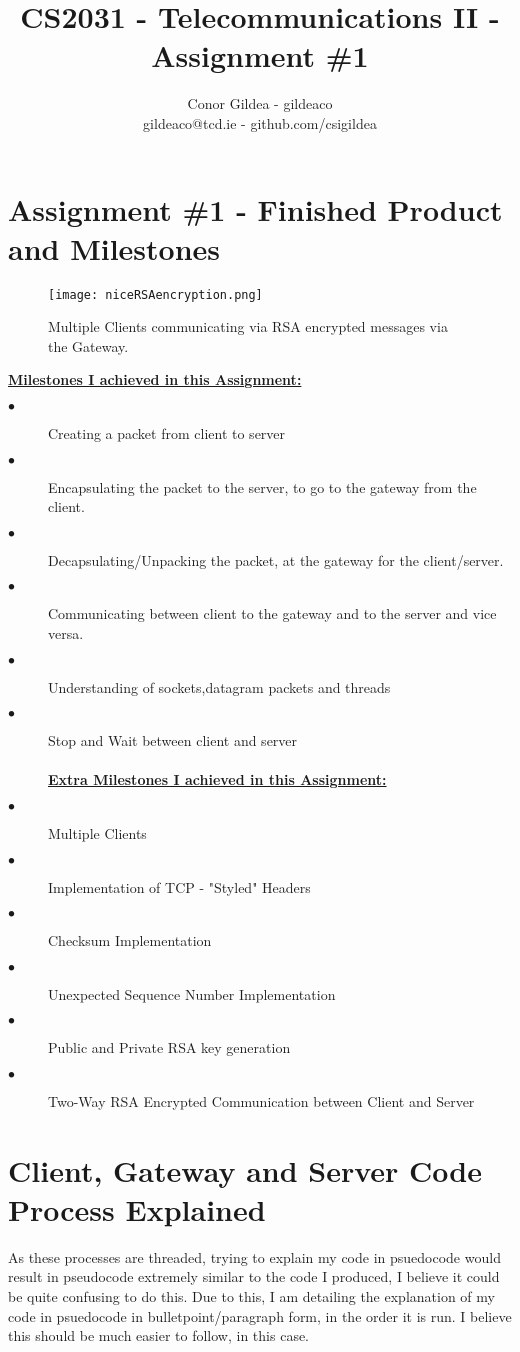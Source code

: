 \documentclass[10pt]{article}
\title{\bf CS2031 - Telecommunications II - Assignment \#1}
\author{Conor Gildea - gildeaco\\ gildeaco@tcd.ie - github.com/csigildea}
\begin{document}
\maketitle

\section{Assignment \#1 - Finished Product and Milestones}
		\begin{figure}[h!]
		\texttt{[image: niceRSAencryption.png]}
		\caption{Multiple Clients communicating via RSA encrypted messages via the Gateway.}
		\label{fig:boat1}
	\end{figure}
	\textbf{\underline{Milestones I achieved in this Assignment:}} 
		\begin{description}
		\item[$\bullet$] Creating a packet from client to server
		\item[$\bullet$] Encapsulating the packet to the server, to go to the gateway from the client.
		\item[$\bullet$] Decapsulating/Unpacking the packet, at the gateway for the client/server.
		\item[$\bullet$] Communicating between client to the gateway and to the server and vice versa.
		\item[$\bullet$] Understanding of sockets,datagram packets and threads
		\item[$\bullet$] Stop and Wait between client and server\\\\\bf{\underline{Extra Milestones I achieved in this Assignment:}} 
		\item[$\bullet$ ]Multiple Clients
		\item[$\bullet$ ]Implementation of TCP - "Styled" Headers
		\item[$\bullet$ ]Checksum Implementation
		\item[$\bullet$ ]Unexpected Sequence Number Implementation
		\item[$\bullet$ ]Public and Private RSA key generation
		\item[$\bullet$ ]Two-Way RSA Encrypted Communication between Client and Server
	\end{description}
\section{Client, Gateway and Server Code Process Explained}
As these processes are threaded, trying to explain my code in psuedocode would result in pseudocode extremely similar to the code I produced, I believe it could be quite confusing to do this. Due to this, I am detailing the explanation of my code in psuedocode in bulletpoint/paragraph form, in the order it is run. I believe this should be much easier to follow, in this case.
\end{document}
